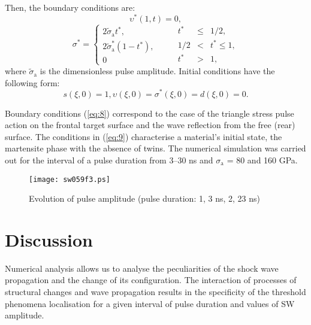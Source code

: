 \documentclass[sw,bibself]{svjour}
\begin{document}
Then, the boundary conditions are:
\[
{\upsilon}^{*} (1, t) = 0,
\]
\begin{equation}
{\sigma}^* = \left\{\begin{array}{l}
2 \tilde {\sigma}_{\mathrm{a}}t^{*},\\[2pt]
2 \tilde {\sigma}_{\mathrm{a}}^{*}{(1-t^{*})},\\[2pt]
0
\end{array}\right.\qquad
\begin{array}{rcl}
t^{*}&\leq&1/2,\\[2pt]
1/2&<&t^{*} \leq 1,\\[2pt]
t^{*}&>&1,
\end{array}
\label{eq:8}
\end{equation}
%
where $\tilde\sigma_{\mathrm{a}}$ is the dimensionless pulse
amplitude. Initial conditions have the following form:
\begin{equation}
s({\xi},0) = 1, \upsilon({\xi},0) = \sigma^{*}({\xi},0) = d({\xi},0) = 0.
\label{eq:9}
\end{equation}

Boundary conditions (\ref{eq:8}) correspond to the case of the triangle
stress
pulse action on the frontal target surface and the wave reflection
from the free (rear) surface. The conditions in (\ref{eq:9}) characterise
a material's initial state, the martensite phase with the absence of
twins. The numerical simulation was carried out for the interval of
a pulse duration from 3--30 ns and $\sigma_{\mathrm{a}}$  = 80 and
160 GPa.

\begin{figure}
\centering\leavevmode\texttt{[image: sw059f3.ps]}
\caption{Evolution of pulse amplitude (pulse duration:
1, 3 ns, 2, 23 ns)}\label{fig3}
\end{figure}

\section{Discussion}
Numerical analysis allows us to analyse the peculiarities of the
shock wave
propagation and the change of its configuration. The interaction of
processes of structural changes and wave propagation results
in the specificity of the threshold phenomena localisation for
a given interval of pulse duration and values of SW amplitude.
\end{document}
